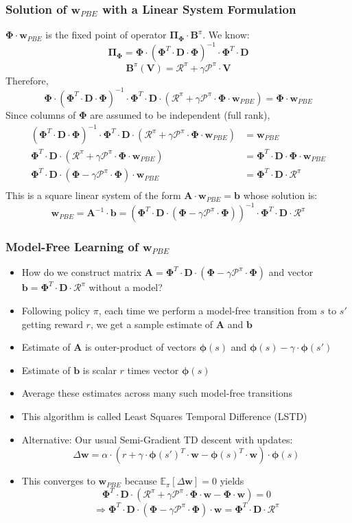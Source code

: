 \documentclass[handout]{beamer}
\newcommand{\bphi}{\bm{\Phi}}
\newcommand{\bb}{\bm{B}^{\pi}}
\newcommand{\bpi}{\bm{\Pi_{\Phi}}}
\newcommand{\bv}{\bm{V}}
\newcommand{\bd}{\bm{D}}
\newcommand{\bw}{\bm{w}}
\newcommand{\brew}{\bm{\mathcal{R}}^{\pi}}
\newcommand{\bprob}{\bm{\mathcal{P}}^{\pi}}
\begin{document}
\begin{frame}
\frametitle{Solution of $\bm{w}_{PBE}$ with a Linear System Formulation}
\pause
$\bphi \cdot \bm{w}_{PBE}$ is the fixed point of operator $\bpi \cdot \bb$. We know:
$$\bpi = \bphi \cdot (\bphi^T \cdot \bd \cdot \bphi)^{-1} \cdot \bphi^T \cdot \bd$$
$$\bb (\bv) = \brew + \gamma \bprob \cdot \bv$$
\pause
Therefore,
$$\bphi \cdot (\bphi^T \cdot \bd \cdot \bphi)^{-1} \cdot \bphi^T \cdot \bd \cdot (\brew + \gamma \bprob \cdot \bphi \cdot \bm{w}_{PBE}) = \bphi \cdot \bm{w}_{PBE}$$
\pause
Since columns of $\bphi$ are assumed to be independent (full rank),
\begin{align*}
(\bphi^T \cdot \bd \cdot \bphi)^{-1} \cdot \bphi^T \cdot \bd \cdot (\brew + \gamma \bprob \cdot \bphi \cdot \bm{w}_{PBE}) & = \bm{w}_{PBE}\\
\bphi^T \cdot \bd \cdot (\brew + \gamma \bprob \cdot \bphi \cdot \bm{w}_{PBE}) &= \bphi^T \cdot \bd \cdot \bphi \cdot \bm{w}_{PBE}\\
\bphi^T \cdot \bd \cdot (\bphi - \gamma \bprob \cdot \bphi) \cdot \bm{w}_{PBE} &= \bphi^T \cdot \bd \cdot \brew\\ 
\end{align*}
\pause
This is a square linear system of the form $\bm{A} \cdot \bm{w}_{PBE} = \bm{b}$ whose solution is:
$$\bm{w}_{PBE} = \bm{A}^{-1} \cdot \bm{b} = (\bphi^T \cdot \bd \cdot (\bphi - \gamma \bprob \cdot \bphi))^{-1} \cdot \bphi^T \cdot \bd \cdot \brew$$
\end{frame}


\begin{frame}
\frametitle{Model-Free Learning of $\bm{w}_{PBE}$}
\pause
\begin{itemize}[<+->]
\item How do we construct matrix $\bm{A} = \bphi^T \cdot \bd \cdot (\bphi - \gamma \bprob \cdot \bphi)$ and vector $\bm{b} = \bphi^T \cdot \bd \cdot \brew$ without a model?
\item Following policy $\pi$, each time we perform a model-free transition from $s$ to $s'$ getting reward $r$, we get a sample estimate of $\bm{A}$ and $\bm{b}$
\item Estimate of $\bm{A}$ is outer-product of vectors $\bm{\phi}(s)$ and $\bm{\phi}(s) - \gamma \cdot \bm{\phi}(s')$
\item Estimate of $\bm{b}$ is scalar $r$ times vector $\bm{\phi}(s)$ 
\item Average these estimates across many such model-free transitions
\item This algorithm is called Least Squares Temporal Difference (LSTD)
\item Alternative: Our usual Semi-Gradient TD descent with updates:
$$\Delta \bw = \alpha \cdot (r + \gamma \cdot \bm{\phi}(s')^T \cdot \bw - \bm{\phi}(s)^T \cdot \bw) \cdot \bm{\phi}(s)$$
\item This converges to $\bm{w}_{PBE}$ because $\mathbb{E}_{\pi}[\Delta \bw] = 0$ yields
$$ \bphi^T \cdot \bd \cdot (\brew + \gamma \bprob \cdot \bphi \cdot \bw - \bphi \cdot \bw) = 0$$
$$ \Rightarrow \bphi^T \cdot \bd \cdot (\bphi - \gamma \bprob \cdot \bphi) \cdot \bw = \bphi^T \cdot \bd \cdot \brew$$ 
\end{itemize}
\end{frame}
\end{document}
